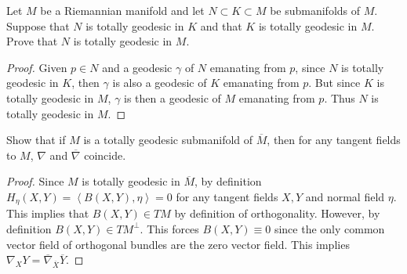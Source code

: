 \documentclass[12pt]{article}
\begin{document}
\begin{problem}[6.3]
Let $ M$ be a Riemannian manifold and let  $ N \subset K \subset M$ be submanifolds of $ M$. Suppose that $ N$ is totally geodesic in  $ K$ and that  $ K$ is totally geodesic in  $ M$. Prove that  $ N$ is totally geodesic in  $ M$.
\end{problem}
\begin{proof}
Given $ p \in N$ and a geodesic $ \gamma$ of $ N$ emanating from  $ p$, since  $ N$ is totally geodesic in  $ K$, then  $ \gamma$ is also a geodesic of $ K$ emanating from  $ p$. But since  $ K$ is totally geodesic in  $ M$,  $ \gamma$ is then a geodesic of $ M$ emanating from  $ p$. Thus  $ N$ is totally geodesic in  $ M$. 
\end{proof}

\begin{problem}[6.7]
Show that if $ M$ is a totally geodesic submanifold of  $ \overline{M}$, then for any tangent fields to $ M$,  $ \nabla$ and $ \overline{\nabla}$ coincide.
\end{problem}
\begin{proof}
Since $ M$ is totally geodesic in  $ \overline{M}$, by definition $ H_{\eta}(X,Y) = \left\langle B(X,Y) ,\eta \right\rangle =0$ for any tangent fields $ X,Y$ and normal field $ \eta $. This implies that $ B(X,Y) \in TM$ by definition of orthogonality. However, by definition $ B(X,Y) \in TM^{\perp}$. This forces $ B(X,Y) \equiv 0$ since the only common vector field of orthogonal bundles are the zero vector field. This implies  $ \nabla_X Y = \overline{\nabla}_{\overline{X}} \overline{Y}$. 
\end{proof}
\end{document}
